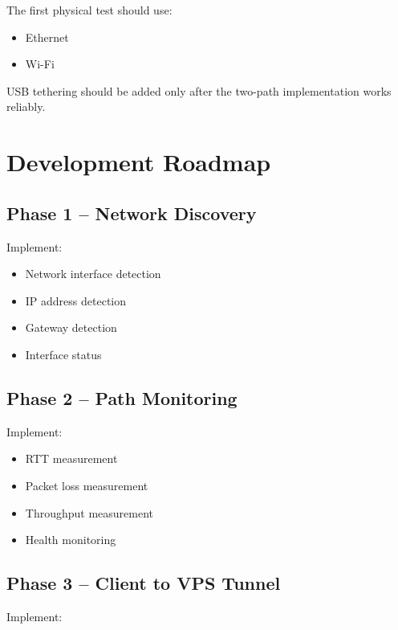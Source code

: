 \documentclass[12pt,a4paper]{article}
\begin{document}
The first physical test should use:

\begin{itemize}
    \item Ethernet
    \item Wi-Fi
\end{itemize}

USB tethering should be added only after the two-path implementation works reliably.


\section{Development Roadmap}

\subsection{Phase 1 -- Network Discovery}

Implement:

\begin{itemize}
    \item Network interface detection
    \item IP address detection
    \item Gateway detection
    \item Interface status
\end{itemize}

\subsection{Phase 2 -- Path Monitoring}

Implement:

\begin{itemize}
    \item RTT measurement
    \item Packet loss measurement
    \item Throughput measurement
    \item Health monitoring
\end{itemize}

\subsection{Phase 3 -- Client to VPS Tunnel}

Implement:
\end{document}

